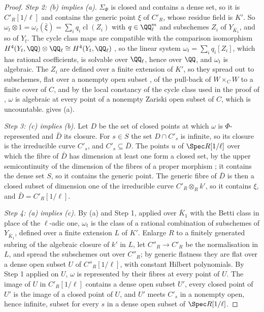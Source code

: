 \begin{proof}
\emph{Step 2: (b) implies (a).} $\Sigma_{\Phi}$ is closed and contains a dense
set, so it is $C'_{R}[1/\ell]$ and contains the generic point $\xi$ of
$C'_{R}$, whose residue field is $K'$. So $\omega_{t}\otimes1=
\omega_{\ell}(\bar\xi)=\sum_{i}q_{i}\operatorname{cl}(Z_{i})$ with
$q\in\QQ_{\ell}^{m}$ and subschemes $Z_{i}$ of $Y_{\bar{K}_{1}}$, and so of
$Y_{t}$. The cycle class maps are compatible with the comparison isomorphism
$H^{4}(Y_{t},\QQ)\otimes\QQ_{\ell}\cong H^{4}(Y_{t},\QQ_{\ell})$
\cite[Section~1 and Example~2.1(a)]{Del82}, so the linear system
$\omega_{t}=\sum_{i}q_{i}[Z_{i}]$, which has rational coefficients, is
solvable over $\QQ_{\ell}$, hence over $\QQ$, and $\omega_{t}$ is algebraic.
The $Z_{i}$ are defined over a finite extension of $K'$, so they spread out to
subschemes, flat over a nonempty open subset \cite[Tag~052A]{Stacks}, of the
pull-back of $W\times_{C}W$ to a finite cover of $C$, and by the local
constancy of the cycle class used in the proof of ,
$\omega$ is algebraic at every point of a nonempty Zariski open subset of $C$,
which is uncountable.  gives (a).

\emph{Step 3: (c) implies (b).} Let $D$ be the set of closed points at which
$\omega$ is $\Phi$-represented and $\bar{D}$ its closure. For $s\in S$ the set
$D\cap C'_{s}$ is infinite, so its closure is the irreducible curve $C'_{s}$,
and $C'_{s}\subseteq\bar{D}$. The points $u$ of $\Spec R[1/\ell]$ over which
the fibre of $\bar{D}$ has dimension at least one form a closed set, by the
upper semicontinuity of the dimension of the fibres of a proper morphism
\cite[Tag~0D4I]{Stacks}; it contains the dense set $S$, so it contains the
generic point. The generic fibre of $\bar{D}$ is then a closed subset of
dimension one of the irreducible curve $C'_{R}\otimes_{R}k'$, so it contains
$\xi$, and $\bar{D}=C'_{R}[1/\ell]$.

\emph{Step 4: (a) implies (c).} By (a) and Step 1, applied over $\bar{K}_{1}$
with the Betti class in place of the $\ell$-adic one, $\omega_{t}$ is the
class of a rational combination of subschemes of $Y_{\bar{K}_{1}}$, defined
over a finite extension $L$ of $K'$. Enlarge $R$ to a finitely generated
subring of the algebraic closure of $k'$ in $L$, let $C''_{R}\to C'_{R}$ be the
normalisation in $L$, and spread the subschemes out over $C''_{R}$; by generic
flatness \cite[Tag~052A]{Stacks} they are flat over a dense open subset $U$ of
$C''_{R}[1/\ell]$, with constant Hilbert polynomials. By Step 1 applied on $U$,
$\omega$ is represented by their fibres at every point of $U$. The image of $U$
in $C'_{R}[1/\ell]$ contains a dense open subset $U'$, every closed point of
$U'$ is the image of a closed point of $U$, and $U'$ meets $C'_{s}$ in a
nonempty open, hence infinite, subset for every $s$ in a dense open subset of
$\Spec R[1/\ell]$.


\end{proof}
